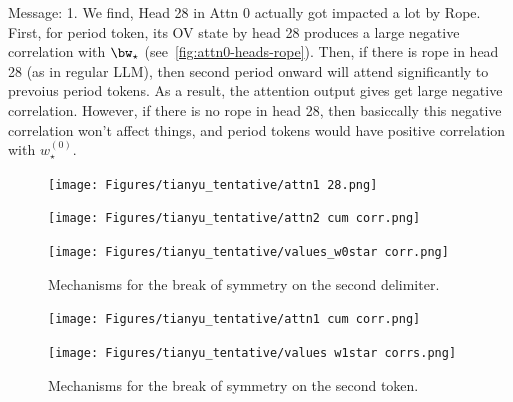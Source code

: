Message: 1. We find, Head 28 in Attn 0 actually got impacted a lot by Rope. First, for period token, its OV state by head 28 produces a large negative correlation with $\bw_\star$ (see~\cref{fig:attn0-heads-rope}). Then, if there is rope in head 28 (as in regular LLM), then second period onward will attend significantly to prevoius period tokens. As a result, the attention output gives get large negative correlation. However, if there is no rope in head 28, then basiccally this negative correlation won't affect things, and period tokens would have positive correlation with $w_\star^{(0)}$. 

\begin{figure}[H]
\centering
\begin{minipage}{.32\textwidth}
\centering
    \label{fig:l0-h28-attn}
    \texttt{[image: Figures/tianyu\_tentative/attn1 28.png]}
\end{minipage}
\begin{minipage}{.32\textwidth}
\centering
    \label{fig:attn-head-corr}
    \texttt{[image: Figures/tianyu\_tentative/attn2 cum corr.png]}
\end{minipage}
\begin{minipage}{.32\textwidth}
\centering
    \label{fig:value-corr}
    \texttt{[image: Figures/tianyu\_tentative/values\_w0star corr.png]}
\end{minipage}
\caption{
\small
Mechanisms for the break of symmetry on the second delimiter.
}
\label{fig:special-neuron}
\vspace{-1em}
\end{figure}

\begin{figure}[H]
\centering
\begin{minipage}{.45\textwidth}
\centering
    \label{fig:attn1-head-corr}
    \texttt{[image: Figures/tianyu\_tentative/attn1 cum corr.png]}
\end{minipage}
\begin{minipage}{.45\textwidth}
\centering
    \label{fig:value1-corr}
    \texttt{[image: Figures/tianyu\_tentative/values w1star corrs.png]}
\end{minipage}
\caption{
\small
Mechanisms for the break of symmetry on the second token.
}
\label{fig:special-neuron}
\vspace{-1em}
\end{figure}




